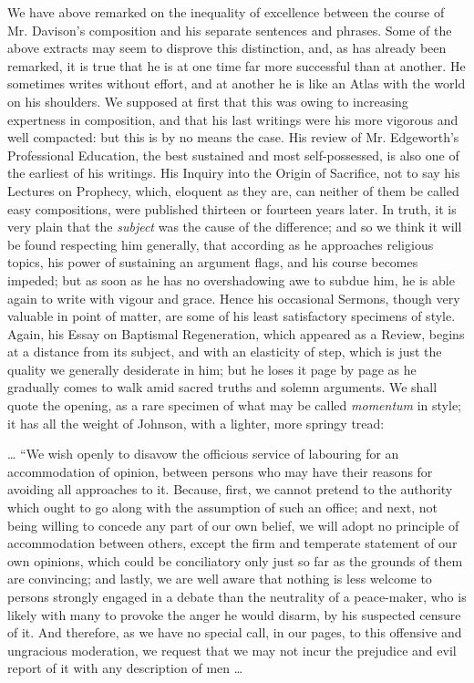 We have above remarked on the inequality of
excellence between the course of Mr. Davison's composition and his
separate sentences and phrases. Some of the above extracts may seem to
disprove this distinction, and, as has already been remarked, it is
true that he is at one time far more successful than at another. He
sometimes writes without effort, and at another he is like an Atlas
with the world on his shoulders. We supposed at first that this was
owing to increasing expertness in composition, and that his last
writings were his more vigorous and well compacted: but this is by no
means the case. His review of Mr. Edgeworth's Professional Education,
the best sustained and most self-possessed, is also one of the
earliest of his writings. His Inquiry into the Origin of Sacrifice,
not to say his Lectures on Prophecy, which, eloquent as they are, can
neither of them be called easy compositions, were published thirteen
or fourteen years later. In truth, it is very plain that the \emph{subject}
was the cause of the difference; and so we think it will be found
respecting him generally, that according as he approaches religious
topics, his power of sustaining an argument flags, and his
course becomes impeded; but as soon as he has no overshadowing awe to
subdue him, he is able again to write with vigour and grace. Hence his
occasional Sermons, though very valuable in point of matter, are some
of his least satisfactory specimens of style. Again, his Essay on
Baptismal Regeneration, which appeared as a Review, begins at a
distance from its subject, and with an elasticity of step, which is
just the quality we generally desiderate in him; but he loses it page
by page as he gradually comes to walk amid sacred truths and solemn
arguments. We shall quote the opening, as a rare specimen of what may
be called \emph{momentum} in style; it has all the weight of Johnson,
with a lighter, more springy tread:

… ``We wish openly to disavow the officious service of
labouring for an accommodation of opinion, between persons who may
have their reasons for avoiding all approaches to it. Because, first,
we cannot pretend to the authority which ought to go along with the
assumption of such an office; and next, not being willing to concede
any part of our own belief, we will adopt no principle of
accommodation between others, except the firm and temperate statement
of our own opinions, which could be conciliatory only just so far as
the grounds of them are convincing; and lastly, we are well aware that
nothing is less welcome to persons strongly engaged in a debate than
the neutrality of a peace-maker, who is likely with many to provoke
the anger he would disarm, by his suspected censure of it. And
therefore, as we have no special call, in our pages, to this offensive
and ungracious moderation, we request that we may not incur the
prejudice and evil report of it with any description of men …

